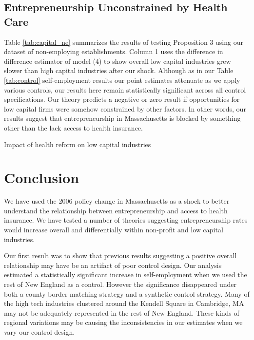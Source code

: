 \section{Entrepreneurship Unconstrained by Health Care}

Table \ref{tab:capital_ne} summarizes the results of testing Proposition 3 using our dataset of non-employing establishments. Column 1 uses the difference in difference estimator of model (4) to show overall low capital industries grew slower than high capital industries after our shock. Although as in our Table \ref{tab:control} self-employment results our point estimates attenuate as we apply various controls, our results here remain statistically significant across all control specifications. Our theory predicts a negative or zero result if opportunities for low capital firms were somehow constrained by other factors. In other words, our results suggest that entrepreneurship in Massachusetts is blocked by something other than the lack access to health insurance. 

\begin{table}[h]
    \footnotesize
	\centering
	\caption{Impact of health reform on low capital industries}
	
	\label{tab:capital_ne}
\end{table} 


\chapter{Conclusion}
\label{sec:conclude}

We have used the 2006 policy change in Massachusetts as a shock to better understand the relationship between entrepreneurship and access to health insurance. We have tested a number of theories suggesting entrepreneurship rates would increase overall and differentially within non-profit and low capital industries. 

Our first result was to show that previous results suggesting a positive overall relationship may have be an artifact of poor control design. Our analysis estimated a statistically significant increase in self-employment when we used the rest of New England as a control. However the significance disappeared under both a county border matching strategy and a synthetic control strategy. Many of the high tech industries clustered around the Kendell Square in Cambridge, MA may not be adequately represented in the rest of New England. These kinds of regional variations may be causing the inconsistencies in our estimates when we vary our control design. 

